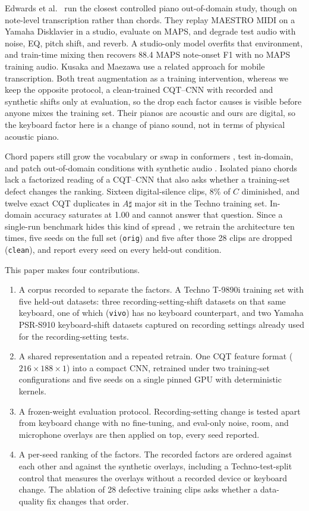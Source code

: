 \documentclass[pdflatex,sn-mathphys-num,iicol]{sn-jnl}
\begin{document}
Edwards et al.\ \cite{Edwards2024} run the closest controlled piano out-of-domain study, though on note-level transcription rather than chords. They replay MAESTRO MIDI on a Yamaha Disklavier in a studio, evaluate on MAPS, and degrade test audio with noise, EQ, pitch shift, and reverb. A studio-only model overfits that environment, and train-time mixing then recovers 88.4 MAPS note-onset F1 with no MAPS training audio. Kusaka and Maezawa \cite{Kusaka2024} use a related approach for mobile transcription. Both treat augmentation as a training intervention, whereas we keep the opposite protocol, a clean-trained CQT--CNN with recorded and synthetic shifts only at evaluation, so the drop each factor causes is visible before anyone mixes the training set. Their pianos are acoustic and ours are digital, so the keyboard factor here is a change of piano sound, not in terms of physical acoustic piano.

Chord papers still grow the vocabulary or swap in conformers \cite{Akram2025}, test in-domain, and patch out-of-domain conditions with synthetic audio \cite{Majchrzak2025,Ostermann2023}. Isolated piano chords lack a factorized reading of a CQT--CNN that also asks whether a training-set defect changes the ranking. Sixteen digital-silence clips, 8\% of $C$ diminished, and twelve exact CQT duplicates in $A\sharp$ major sit in the Techno training set. In-domain accuracy saturates at 1.00 and cannot answer that question. Since a single-run benchmark hides this kind of spread \cite{Bouthillier2021}, we retrain the architecture ten times, five seeds on the full set (\texttt{orig}) and five after those 28 clips are dropped (\texttt{clean}), and report every seed on every held-out condition.

This paper makes four contributions.
\begin{enumerate}
\item A corpus recorded to separate the factors. A Techno T-9890i training set with five held-out datasets: three recording-setting-shift datasets on that same keyboard, one of which (\texttt{vivo}) has no keyboard counterpart, and two Yamaha PSR-S910 keyboard-shift datasets captured on recording settings already used for the recording-setting tests.
\item A shared representation and a repeated retrain. One CQT feature format ($216\times188\times1$) into a compact CNN, retrained under two training-set configurations and five seeds on a single pinned GPU with deterministic kernels.
\item A frozen-weight evaluation protocol. Recording-setting change is tested apart from keyboard change with no fine-tuning, and eval-only noise, room, and microphone overlays are then applied on top, every seed reported.
\item A per-seed ranking of the factors. The recorded factors are ordered against each other and against the synthetic overlays, including a Techno-test-split control that measures the overlays without a recorded device or keyboard change. The ablation of 28 defective training clips asks whether a data-quality fix changes that order.
\end{enumerate}
\end{document}

